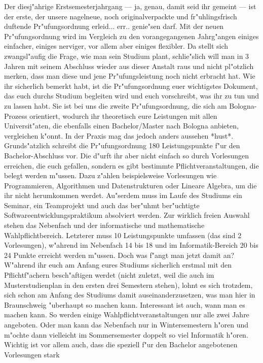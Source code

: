 Der diesj"ahrige Erstsemesterjahrgang --- ja, genau, damit seid ihr gemeint --- ist der erste, der unsere
nagelneue, noch originalverpackte und fr"uhlingsfrisch duftende Pr"ufungsordnung erleid... err..
genie"sen darf. Mit der neuen Pr"ufungsordnung wird im Vergleich zu den vorangegangenen
Jahrg"angen einiges einfacher, einiges nerviger, vor allem aber einiges flexibler. Da stellt sich
zwangsl"aufig die Frage, wie man sein Studium plant, schlie"slich will man in 3 Jahren mit seinem
Abschluss wieder aus dieser Anstalt raus und nicht pl"otzlich merken, dass man diese und jene
Pr"ufungsleistung noch nicht erbracht hat.
Wie ihr sicherlich bemerkt habt, ist die Pr"ufungsordnung euer wichtigstes Dokument, das euch
durchs Studium begleiten wird und euch vorschreibt, was ihr zu tun und zu lassen habt. Sie ist bei
uns die zweite Pr"ufungsordnung, die sich am Bologna-Prozess orientiert, wodurch ihr theoretisch
eure Leistungen mit allen Universit"aten, die ebenfalls einen Bachelor/Master nach Bologna
anbieten, vergleichen k"onnt. In der Praxis mag das jedoch anders aussehen *hust*.
Grunds"atzlich schreibt die Pr"ufungsordnung 180 Leistungspunkte f"ur den Bachelor-Abschluss vor.
Die d"urft ihr aber nicht einfach so durch Vorlesungen erreichen, die euch gefallen, sondern es gibt
bestimmte Pflichtveranstaltungen, die belegt werden m"ussen. Dazu z"ahlen beispielsweise
Vorlesungen wie Programmieren, Algorithmen und Datenstrukturen oder Lineare Algebra, um die
ihr nicht herumkommen werdet. Au"serdem muss im Laufe des Studiums ein Seminar, ein
Teamprojekt und auch das ber"uhmt ber"uchtigte Softwareentwicklungspraktikum absolviert werden.
Zur wirklich freien Auswahl stehen das Nebenfach und der informatische und mathematische
Wahlpflichtbereich. Letzterer muss 10 Leistungspunkte umfassen (das sind 2 Vorlesungen),
w"ahrend im Nebenfach 14 bis 18 und im Informatik-Bereich 20 bis 24 Punkte erreicht werden
m"ussen.
Doch was f"angt man jetzt damit an? W"ahrend ihr euch am Anfang eures Studiums sicherlich
erstmal mit den Pflichtf"achern besch"aftigen werdet (nicht zuletzt, weil die auch im
Musterstudienplan in den ersten drei Semestern stehen), lohnt es sich trotzdem, sich schon am
Anfang des Studiums damit auseinanderzusetzen, was man hier in Braunschweig "uberhaupt so
machen kann. Interessant ist auch, wann man es machen kann. So werden einige
Wahlpflichtveranstaltungen nur alle zwei Jahre angeboten. Oder man kann das Nebenfach nur in
Wintersemestern h"oren und m"ochte dann vielleicht im Sommersemester doppelt so viel Informatik
h"oren.
Wichtig ist vor allem auch, dass die speziell f"ur den Bachelor angebotenen Vorlesungen stark
